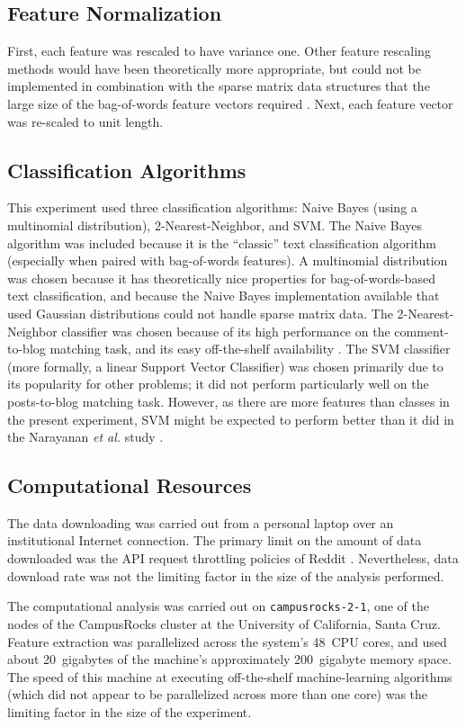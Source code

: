 \documentclass[12pt]{article}
\begin{document}
\subsection{Feature Normalization}
First, each feature was rescaled to have variance one. Other feature rescaling methods would have been theoretically more appropriate, but could not be implemented in combination with the sparse matrix data structures that the large size of the bag-of-words feature vectors required  \cite{narayanan2012feasibility}. Next, each feature vector was re-scaled to unit length.

\subsection{Classification Algorithms}
This experiment used three classification algorithms: Naive Bayes (using a multinomial distribution), 2-Nearest-Neighbor, and SVM. The Naive Bayes algorithm was included because it is the ``classic'' text classification algorithm (especially when paired with bag-of-words features). A multinomial distribution was chosen because it has theoretically nice properties for bag-of-words-based text classification, and because the Naive Bayes implementation available that used Gaussian distributions could not handle sparse matrix data. The 2-Nearest-Neighbor classifier was chosen because of its high performance on the comment-to-blog matching task, and its easy off-the-shelf availability \cite{narayanan2012feasibility, pedregosa2011scikit}. The SVM classifier (more formally, a linear Support Vector Classifier) was chosen primarily due to its popularity for other problems; it did not perform particularly well on the posts-to-blog matching task. However, as there are more features than classes in the present experiment, SVM might be expected to perform better than it did in the Narayanan \textit{et al.} study \cite{narayanan2012feasibility}.

\subsection{Computational Resources}
The data downloading was carried out from a personal laptop over an institutional Internet connection. The primary limit on the amount of data downloaded was the API request throttling policies of Reddit \cite{boe2012python}. Nevertheless, data download rate was not the limiting factor in the size of the analysis performed.

The computational analysis was carried out on \texttt{campusrocks-2-1}, one of the nodes of the CampusRocks cluster at the University of California, Santa Cruz. Feature extraction was parallelized across the system's 48~CPU cores, and used about 20~gigabytes of the machine's approximately 200~gigabyte memory space. The speed of this machine at executing off-the-shelf machine-learning algorithms (which did not appear to be parallelized across more than one core) was the limiting factor in the size of the experiment.
\end{document}
